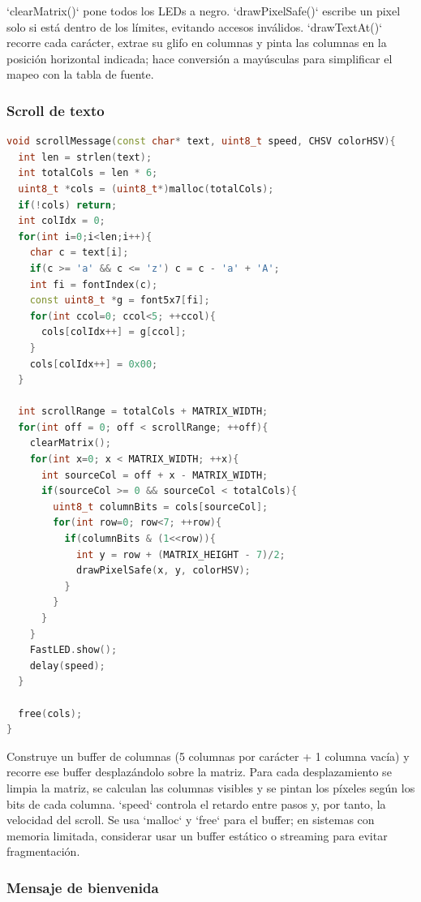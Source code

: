 \documentclass[a4paper,12pt]{article}
\begin{document}
`clearMatrix()` pone todos los LEDs a negro. `drawPixelSafe()` escribe un pixel solo si está dentro de los límites, evitando accesos inválidos. `drawTextAt()` recorre cada carácter, extrae su glifo en columnas y pinta las columnas en la posición horizontal indicada; hace conversión a mayúsculas para simplificar el mapeo con la tabla de fuente.

\subsubsection{Scroll de texto}

\begin{lstlisting}[language=C++, caption={Función scrollMessage}]
void scrollMessage(const char* text, uint8_t speed, CHSV colorHSV){
  int len = strlen(text);
  int totalCols = len * 6;
  uint8_t *cols = (uint8_t*)malloc(totalCols);
  if(!cols) return;
  int colIdx = 0;
  for(int i=0;i<len;i++){
    char c = text[i];
    if(c >= 'a' && c <= 'z') c = c - 'a' + 'A';
    int fi = fontIndex(c);
    const uint8_t *g = font5x7[fi];
    for(int ccol=0; ccol<5; ++ccol){
      cols[colIdx++] = g[ccol];
    }
    cols[colIdx++] = 0x00;
  }

  int scrollRange = totalCols + MATRIX_WIDTH;
  for(int off = 0; off < scrollRange; ++off){
    clearMatrix();
    for(int x=0; x < MATRIX_WIDTH; ++x){
      int sourceCol = off + x - MATRIX_WIDTH;
      if(sourceCol >= 0 && sourceCol < totalCols){
        uint8_t columnBits = cols[sourceCol];
        for(int row=0; row<7; ++row){
          if(columnBits & (1<<row)){
            int y = row + (MATRIX_HEIGHT - 7)/2;
            drawPixelSafe(x, y, colorHSV);
          }
        }
      }
    }
    FastLED.show();
    delay(speed);
  }

  free(cols);
}
\end{lstlisting}

Construye un buffer de columnas (5 columnas por carácter + 1 columna vacía) y recorre ese buffer desplazándolo sobre la matriz. Para cada desplazamiento se limpia la matriz, se calculan las columnas visibles y se pintan los píxeles según los bits de cada columna. `speed` controla el retardo entre pasos y, por tanto, la velocidad del scroll. Se usa `malloc` y `free` para el buffer; en sistemas con memoria limitada, considerar usar un buffer estático o streaming para evitar fragmentación.

\subsubsection{Mensaje de bienvenida}
\end{document}
